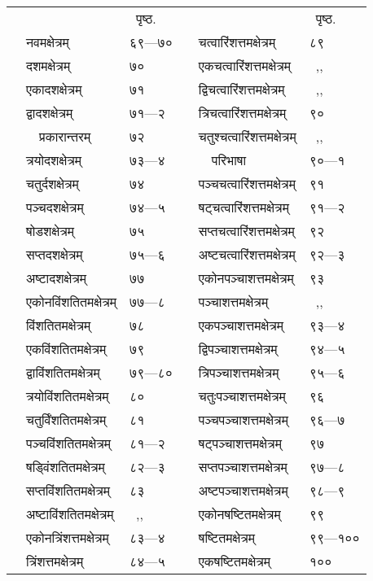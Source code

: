 \documentclass[11pt, openany]{book}
\begin{document}
\newpage
\begin{center}
\begin{tabular}{p{1.5in} l | p{1.5in} l}
& ~पृष्ठ.& & ~पृष्ठ.\\
~~नवमक्षेत्रम् & ६९---७० & ~~चत्वारिंशत्तमक्षेत्रम् & ८९\\
~~दशमक्षेत्रम् & ७० & ~~एकचत्वारिंशत्तमक्षेत्रम् & ~,,\\
~~एकादशक्षेत्रम् & ७१ & ~~द्विचत्वारिंशत्तमक्षेत्रम् & ~,,\\
~~द्वादशक्षेत्रम् & ७१---२ & ~~त्रिचत्वारिंशत्तमक्षेत्रम् & ९०\\
~~~~प्रकारान्तरम् & ७२ & ~~चतुश्चत्वारिंशत्तमक्षेत्रम् & ~,,\\
~~त्रयोदशक्षेत्रम् & ७३---४ & ~~~~परिभाषा & ९०---१\\
~~चतुर्दशक्षेत्रम् & ७४ & ~~पञ्चचत्वारिंशत्तमक्षेत्रम् & ९१\\
~~पञ्चदशक्षेत्रम् & ७४---५ & ~~षट्चत्वारिंशत्तमक्षेत्रम् & ९१---२\\
~~षोडशक्षेत्रम् & ७५ & ~~सप्तचत्वारिंशत्तमक्षेत्रम् & ९२\\
~~सप्तदशक्षेत्रम् & ७५---६ & ~~अष्टचत्वारिंशत्तमक्षेत्रम् & ९२---३\\
~~अष्टादशक्षेत्रम् & ७७ & ~~एकोनपञ्चाशत्तमक्षेत्रम् & ९३\\
~~एकोनविंशतितमक्षेत्रम् & ७७---८ & ~~पञ्चाशत्तमक्षेत्रम् & ~,,\\
~~विंशतितमक्षेत्रम् & ७८ & ~~एकपञ्चाशत्तमक्षेत्रम् & ९३---४\\
~~एकविंशतितमक्षेत्रम् & ७९ & ~~द्विपञ्चाशत्तमक्षेत्रम् & ९४---५\\
~~द्वाविंशतितमक्षेत्रम् & ७९---८० & ~~त्रिपञ्चाशत्तमक्षेत्रम् & ९५---६\\
~~त्रयोविंशतितमक्षेत्रम् & ८० & ~~चतुःपञ्चाशत्तमक्षेत्रम् & ९६\\
~~चतुर्विंशतितमक्षेत्रम् & ८१ & ~~पञ्चपञ्चाशत्तमक्षेत्रम् & ९६---७\\
~~पञ्चविंशतितमक्षेत्रम् & ८१---२ & ~~षट्पञ्चाशत्तमक्षेत्रम् & ९७\\
~~षड्विंशतितमक्षेत्रम् & ८२---३ & ~~सप्तपञ्चाशत्तमक्षेत्रम् & ९७---८\\
~~सप्तविंशतितमक्षेत्रम् & ८३ & ~~अष्टपञ्चाशत्तमक्षेत्रम् & ९८---९\\
~~अष्टाविंशतितमक्षेत्रम् & ~,, & ~~एकोनषष्टितमक्षेत्रम् & ९९\\
~~एकोनत्रिंशत्तमक्षेत्रम् & ८३---४ & ~~षष्टितमक्षेत्रम् & ९९---१००\\
~~त्रिंशत्तमक्षेत्रम् & ८४---५ & ~~एकषष्टितमक्षेत्रम् & १००\\

\end{tabular}
\end{center}
\end{document}

